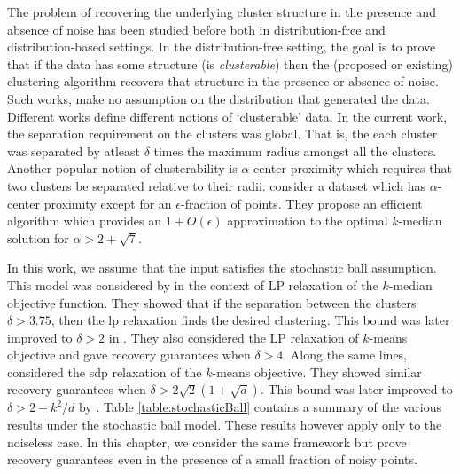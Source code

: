 \documentclass[12pt]{article}
\begin{document}
The problem of recovering the underlying cluster structure in the presence and absence of noise has been studied before both in distribution-free and distribution-based settings. In the distribution-free setting, the goal is to prove that if the data has some structure (is {\em clusterable}) then the (proposed or existing) clustering algorithm recovers that structure in the presence or absence of noise. Such works, make no assumption on the distribution that generated the data. Different works define different notions of `clusterable' data. In the current work, the separation requirement on the clusters was global. That is, the each cluster was separated by atleast $\delta$ times the maximum radius amongst all the clusters. Another popular notion of clusterability is $\alpha$-center proximity \cite{awasthi2012center} which requires that two clusters be separated relative to their radii. \cite{balcan2012clustering} consider a dataset which has $\alpha$-center proximity except for an $\epsilon$-fraction of points. They propose an efficient algorithm which provides an $1+O(\epsilon)$ approximation to the optimal $k$-median solution for $\alpha > 2 + \sqrt{7}$.

In this work, we assume that the input satisfies the stochastic ball assumption. This model was considered by \cite{nellore2015recovery} in the context of LP relaxation of the $k$-median objective function. They showed that if the separation between the clusters $\delta > 3.75$, then the lp relaxation finds the desired clustering. This bound was later improved to $\delta > 2$ in \cite{awasthi2015relax}. They also considered the LP relaxation of $k$-means objective and gave recovery guarantees when $\delta > 4$. Along the same lines, \cite{awasthi2015relax} considered the sdp relaxation of the $k$-means objective. They showed similar recovery guarantees when $\delta > 2\sqrt 2 (1 + \sqrt d)$. This bound was later improved to $\delta > 2 + k^2/d$ by \cite{iguchi2017probably}. Table \ref{table:stochasticBall} contains a summary of the various results under the stochastic ball model. These results however apply only to the noiseless case. In this chapter, we consider the same framework but prove recovery guarantees even in the presence of a small fraction of noisy points. 
\end{document}
